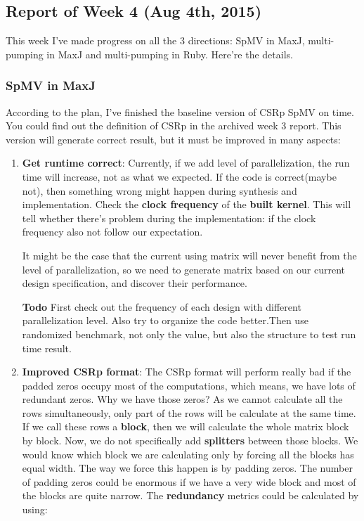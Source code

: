 
\subsection{Report of Week 4 (Aug 4th, 2015)}

This week I've made progress on all the 3 directions: SpMV in MaxJ, multi-pumping in MaxJ and multi-pumping in Ruby. Here're the details.

\subsubsection{SpMV in MaxJ}
According to the plan, I've finished the baseline version of CSRp SpMV on time. You could find out the definition of CSRp in the archived week 3 report. This version will generate correct result, but it must be improved in many aspects:
\begin{enumerate}
\item 
\textbf{Get runtime correct}: Currently, if we add level of parallelization, the run time will increase, not as what we expected. If the code is correct(maybe not), then something wrong might happen during synthesis and implementation. Check the \textbf{clock frequency} of the \textbf{built kernel}. This will tell whether there's problem during the implementation: if the clock frequency also not follow our expectation.

It might be the case that the current using matrix will never benefit from the level of parallelization, so we need to generate matrix based on our current design specification, and discover their performance.

\textbf{Todo} First check out the frequency of each design with different parallelization level. Also try to organize the code better.Then use randomized benchmark, not only the value, but also the structure to test run time result. 

\item
\textbf{Improved CSRp format}: The CSRp format will perform really bad if the padded zeros occupy most of the computations, which means, we have lots of redundant zeros. Why we have those zeros? As we cannot calculate all the rows simultaneously, only part of the rows will be calculate at the same time. If we call these rows a \textbf{block}, then we will calculate the whole matrix block by block. Now, we do not specifically add \textbf{splitters} between those blocks. We would know which block we are calculating only by forcing all the blocks has equal width. The way we force this happen is by padding zeros. The number of padding zeros could be enormous if we have a very wide block and most of the blocks are quite narrow. The \textbf{redundancy} metrics could be calculated by using:


\end{enumerate}
